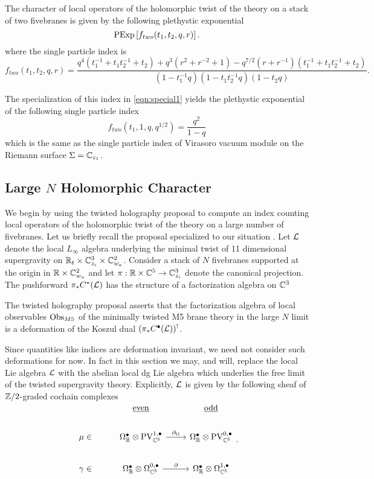 \documentclass[11pt]{amsart}
\begin{document}
\begin{conj}
The character of local operators of the holomorphic twist of the theory on a stack of two fivebranes is given by the following plethystic exponential
\[
{\rm PExp} \left[f_{two} (t_1,t_2,q,r) \right] .
\]
where the single particle index is
\[
f_{two} (t_1,t_2,q,r) = \frac{q^4(t_1^{-1} + t_1 t_2^{-1}  + t_2) + q^3 (r^2 + r^{-2} + 1) - q^{7/2} (r + r^{-1})(t_1^{-1} + t_1t_2^{-1} + t_2)}{(1-t_1^{-1}q) (1-t_1 t_2^{-1} q) (1-t_2 q)} .
\]
\end{conj}

\parsec[]

The specialization of this index in \eqref{eqn:special1} yields the plethystic exponential of the following single particle index
\[
f_{two}(t_1, 1, q, q^{1/2}) = \frac{q^2}{1-q} 
\]
which is the same as the single particle index of Virasoro vacuum module on the Riemann surface $\Sigma = \mathbb{C}_{z_1}$. 

\subsection{Large $N$ Holomorphic Character}

We begin by using the twisted holography proposal to compute an index counting local operators of the holomorphic twist of the theory on a large number of fivebranes. Let us briefly recall the proposal specialized to our situation . Let $\mathcal L$ denote the local $L_{\infty}$ algebra underlying the minimal twist of 11 dimensional supergravity on $\mathbb{R}_{t}\times \mathbb{C}^{3}_{z_{i}}\times \mathbb{C}^{2}_{w_{a}}$. Consider a stack of $N$ fivebranes supported at the origin in $\mathbb{R}\times \mathbb{C}^{2}_{w_{a}}$ and let $\pi : \mathbb{R}\times \mathbb{C}^{5}\to \mathbb{C}^{3}_{z_{i}}$ denote the canonical projection. The pushforward $\pi_{*} C^{*}(\mathcal L)$ has the structure of a factorization algebra on $\mathbb{C}^{3}$

The twisted holography proposal asserts that the factorization algebra of local observables ${\rm Obs}_{M5}$ of the minimally twisted M5 brane theory in the large $N$ limit is a deformation of the Koszul dual $(\pi_{*} C^{\bullet}(\mathcal L))^{!}$.

Since quantities like indices are deformation invariant, we need not consider such deformations for now. In fact in this section we may, and will, replace the local Lie algebra $\mathcal L$ with the abelian local dg Lie algebra which underlies the free limit of the twisted supergravity theory.
Explicitly, $\mathcal L$ is given by the following sheaf of $\mathbb{Z}/2$-graded cochain complexes
\[
\begin{tikzcd}
  &  \ul{\rm even} & \ul{\rm odd} \\
 \mu \in & \Omega^{\bullet}_{\R}\otimes\PV^{1,\bullet}_{\C^{5}} \ar[r, "\del_{\Omega}"] & \Omega^{\bullet}_{\R}\otimes\PV^{0,\bullet}_{\C^{5}}\\
 \gamma \in & \Omega^{\bullet}_{\R}\otimes\Omega^{0,\bullet}_{\C^{5}} \ar[r, "\del"]
& \Omega^{\bullet}_{\R}\otimes\Omega^{1,\bullet}_{\C^{5}}\end{tikzcd}
.\]
\end{document}
